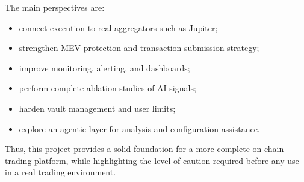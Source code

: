 \documentclass[12pt,a4paper]{report}
\begin{document}
The main perspectives are:
\begin{itemize}
    \item connect execution to real aggregators such as Jupiter;
    \item strengthen MEV protection and transaction submission strategy;
    \item improve monitoring, alerting, and dashboards;
    \item perform complete ablation studies of AI signals;
    \item harden vault management and user limits;
    \item explore an agentic layer for analysis and configuration assistance.
\end{itemize}

Thus, this project provides a solid foundation for a more complete on-chain trading platform, while highlighting the level of caution required before any use in a real trading environment.
\end{document}
